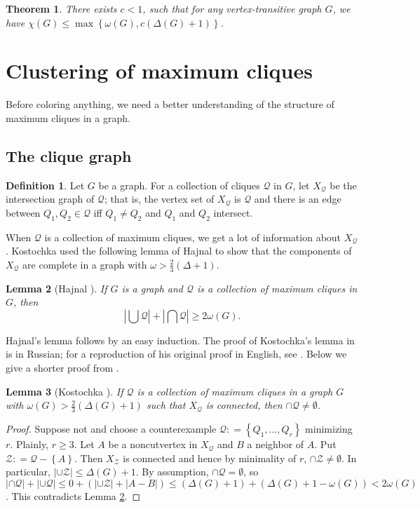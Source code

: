 \documentclass[12pt]{article}
\theoremstyle{plain}
\newtheorem{thm}{Theorem}[section]
\newtheorem{lem}[thm]{Lemma}
\theoremstyle{definition}
\newtheorem{defn}{Definition}
\theoremstyle{remark}
\newcommand{\fancy}[1]{\mathcal{#1}}
\newcommand{\set}[1]{\left\{ #1 \right\}}
\newcommand{\card}[1]{\left|#1\right|}
\newcommand{\DefinedAs}{\mathrel{\mathop:}=}
\def\Q{\fancy{Q}}
\begin{document}
\begin{thm}
There exists $c < 1$, such that for any vertex-transitive graph $G$, we have $\chi(G) \le \max \set{\omega(G), c(\Delta(G) + 1)}$.
\end{thm}

\section{Clustering of maximum cliques}
Before coloring anything, we need a better understanding of the structure of maximum cliques in a graph.
\subsection{The clique graph}
\begin{defn}
Let $G$ be a graph. For a collection of cliques $\Q$ in $G$, let $X_\Q$ be the intersection graph of $\Q$; that is, the vertex set of $X_\Q$ is $\Q$ and there is an edge between $Q_1, Q_2 \in \Q$ iff $Q_1 \ne Q_2$ and $Q_1$ and $Q_2$ intersect.
\end{defn}

When $\Q$ is a collection of maximum cliques, we get a lot of information about $X_\Q$.  Kostochka \cite{kostochkaRussian} used the following lemma of Hajnal \cite{HajnalSaturation} to show that the components of $X_\Q$ are complete in a graph with $\omega > \frac23 (\Delta + 1)$.

\begin{lem}[Hajnal \cite{HajnalSaturation}]\label{HajnalLemma}
If $G$ is a graph and $\Q$ is a collection of maximum cliques in $G$, then 
\[\card{\bigcup \Q} + \card{\bigcap \Q} \geq 2\omega(G).\]
\end{lem}

Hajnal's lemma follows by an easy induction.  The proof of Kostochka's lemma in
\cite{kostochkaRussian} is in Russian; for a reproduction of his original proof
in English, see \cite{rabernhitting}.  Below we give a shorter proof from
\cite{raberndiss}.

\begin{lem}[Kostochka \cite{kostochkaRussian}]\label{KostochkaCliqueGraph}
If $\Q$ is a collection of maximum cliques in a graph $G$ with $\omega(G) > \frac23 (\Delta(G) + 1)$ such that $X_\Q$ is connected, then $\cap \Q \neq \emptyset$. 
\end{lem}
\begin{proof}
Suppose not and choose a counterexample $\Q \DefinedAs \set{Q_1, \ldots, Q_r}$
minimizing $r$. Plainly, $r \geq 3$. Let $A$ be a noncutvertex in $X_{\Q}$ and
$B$ a neighbor of $A$. Put $\fancy{Z} \DefinedAs \Q - \set{A}$. Then
$X_{\fancy{Z}}$ is connected and hence by minimality of $r$, $\cap \fancy{Z}
\neq \emptyset$. In particular, $\card{\cup \fancy{Z}} \leq \Delta(G) + 1$.
By assumption, $\cap\Q=\emptyset$, so $\card{\cap \Q} + \card{\cup \Q} \leq 0 +
(\card{\cup \fancy{Z}} + \card{A - B}) \leq
(\Delta(G) + 1) + (\Delta(G)+1 - \omega(G)) < 2\omega(G)$. This contradicts
Lemma \ref{HajnalLemma}.
\end{proof}
\end{document}
